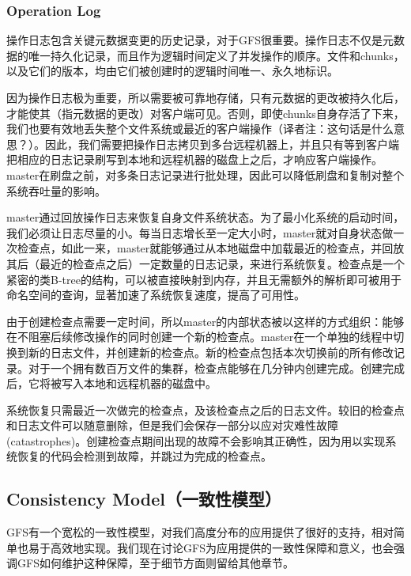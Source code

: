 \documentclass{article}
\begin{document}
\subsubsection{Operation Log}
操作日志包含关键元数据变更的历史记录，对于GFS很重要。操作日志不仅是元数据的唯一持久化记录，而且作为逻辑时间定义了并发操作的顺序。文件和chunks，以及它们的版本，均由它们被创建时的逻辑时间唯一、永久地标识。\par
因为操作日志极为重要，所以需要被可靠地存储，只有元数据的更改被持久化后，才能使其（指元数据的更改）对客户端可见。否则，即使chunks自身存活了下来，我们也要有效地丢失整个文件系统或最近的客户端操作（译者注：这句话是什么意思？）。因此，我们需要把操作日志拷贝到多台远程机器上，并且只有等到客户端把相应的日志记录刷写到本地和远程机器的磁盘上之后，才响应客户端操作。master在刷盘之前，对多条日志记录进行批处理，因此可以降低刷盘和复制对整个系统吞吐量的影响。\par
master通过回放操作日志来恢复自身文件系统状态。为了最小化系统的启动时间，我们必须让日志尽量的小。每当日志增长至一定大小时，master就对自身状态做一次检查点，如此一来，master就能够通过从本地磁盘中加载最近的检查点，并回放其后（最近的检查点之后）一定数量的日志记录，来进行系统恢复。检查点是一个紧密的类B-tree的结构，可以被直接映射到内存，并且无需额外的解析即可被用于命名空间的查询，显著加速了系统恢复速度，提高了可用性。\par
由于创建检查点需要一定时间，所以master的内部状态被以这样的方式组织：能够在不阻塞后续修改操作的同时创建一个新的检查点。master在一个单独的线程中切换到新的日志文件，并创建新的检查点。新的检查点包括本次切换前的所有修改记录。对于一个拥有数百万文件的集群，检查点能够在几分钟内创建完成。创建完成后，它将被写入本地和远程机器的磁盘中。\par
系统恢复只需最近一次做完的检查点，及该检查点之后的日志文件。较旧的检查点和日志文件可以随意删除，但是我们会保存一部分以应对灾难性故障(catastrophes)。创建检查点期间出现的故障不会影响其正确性，因为用以实现系统恢复的代码会检测到故障，并跳过为完成的检查点。

\subsection{Consistency Model（一致性模型）}
GFS有一个宽松的一致性模型，对我们高度分布的应用提供了很好的支持，相对简单也易于高效地实现。我们现在讨论GFS为应用提供的一致性保障和意义，也会强调GFS如何维护这种保障，至于细节方面则留给其他章节。
\end{document}
